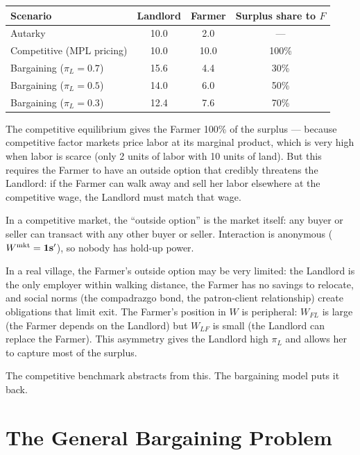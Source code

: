 \documentclass[../structural_economics_book.tex]{subfiles}
\begin{document}
\begin{example}
\begin{center}
\begin{tabular}{lccc}
\toprule
Scenario & Landlord & Farmer & Surplus share to $F$ \\
\midrule
Autarky & 10.0 & 2.0 & --- \\
Competitive (MPL pricing) & 10.0 & 10.0 & 100\% \\
Bargaining ($\pi_L = 0.7$) & 15.6 & 4.4 & 30\% \\
Bargaining ($\pi_L = 0.5$) & 14.0 & 6.0 & 50\% \\
Bargaining ($\pi_L = 0.3$) & 12.4 & 7.6 & 70\% \\
\bottomrule
\end{tabular}
\end{center}
\end{example}

\begin{intuition}
The competitive equilibrium gives the Farmer 100\% of the surplus --- because competitive factor markets price labor at its marginal product, which is very high when labor is scarce (only 2 units of labor with 10 units of land). But this requires the Farmer to have an outside option that credibly threatens the Landlord: if the Farmer can walk away and sell her labor elsewhere at the competitive wage, the Landlord must match that wage.

In a competitive market, the ``outside option'' is the market itself: any buyer or seller can transact with any other buyer or seller. Interaction is anonymous ($W^{\text{mkt}} = \mathbf{1}\mathbf{s}'$), so nobody has hold-up power.

In a real village, the Farmer's outside option may be very limited: the Landlord is the only employer within walking distance, the Farmer has no savings to relocate, and social norms (the compadrazgo bond, the patron-client relationship) create obligations that limit exit. The Farmer's position in $W$ is peripheral: $W_{FL}$ is large (the Farmer depends on the Landlord) but $W_{LF}$ is small (the Landlord can replace the Farmer). This asymmetry gives the Landlord high $\pi_L$ and allows her to capture most of the surplus.

The competitive benchmark abstracts from this. The bargaining model puts it back.
\end{intuition}


\section{The General Bargaining Problem}
\label{ch07:sec:general}
\end{document}
